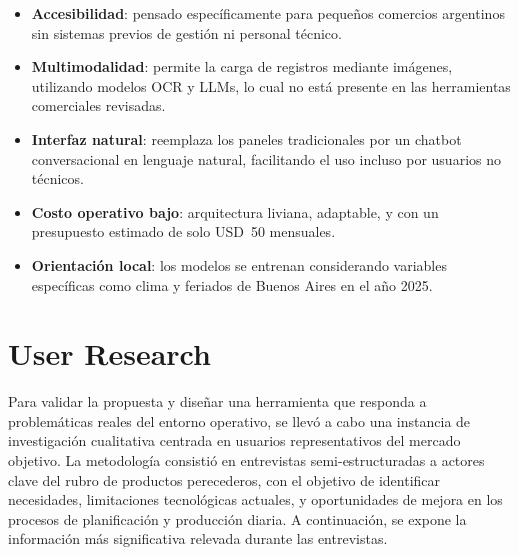 \begin{itemize}
    \item \textbf{Accesibilidad}: pensado específicamente para pequeños comercios argentinos sin sistemas previos de gestión ni personal técnico.

    \item \textbf{Multimodalidad}: permite la carga de registros mediante imágenes, utilizando modelos OCR y LLMs, lo cual no está presente en las herramientas comerciales revisadas.

    \item \textbf{Interfaz natural}: reemplaza los paneles tradicionales por un chatbot conversacional en lenguaje natural, facilitando el uso incluso por usuarios no técnicos.

    \item \textbf{Costo operativo bajo}: arquitectura liviana, adaptable, y con un presupuesto estimado de solo USD~50 mensuales.

    \item \textbf{Orientación local}: los modelos se entrenan considerando variables específicas como clima y feriados de Buenos Aires en el año 2025.
\end{itemize}


\section{User Research}

Para validar la propuesta y diseñar una herramienta que responda a problemáticas reales del entorno operativo, se llevó a cabo una instancia de investigación cualitativa centrada en usuarios representativos del mercado objetivo. La metodología consistió en entrevistas semi-estructuradas a actores clave del rubro de productos perecederos, con el objetivo de identificar necesidades, limitaciones tecnológicas actuales, y oportunidades de mejora en los procesos de planificación y producción diaria. A continuación, se expone la información más significativa relevada durante las entrevistas.

